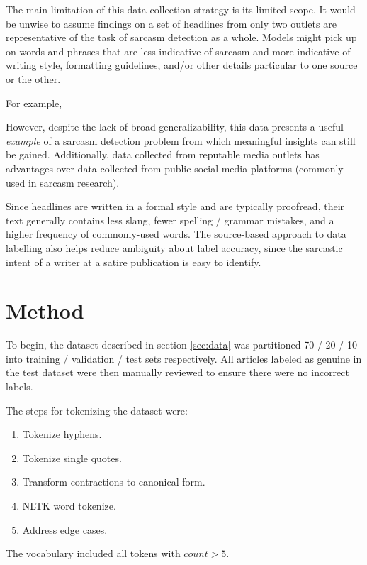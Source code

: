 \documentclass[11pt]{article}
\begin{document}
The main limitation of this data collection strategy is its limited scope. It
would be unwise to assume findings on a set of headlines from only two outlets
are representative of the task of sarcasm detection as a whole. Models might
pick up on words and phrases that are less indicative of sarcasm and more
indicative of writing style, formatting guidelines, and/or other details
particular to one source or the other.

For example,


However, despite the lack of broad generalizability, this data presents a
useful \textit{example} of a sarcasm detection problem from which meaningful
insights can still be gained. Additionally, data collected from reputable media
outlets has advantages over data collected from public social media platforms
(commonly used in sarcasm research).

Since headlines are written in a formal style and are typically proofread,
their text generally contains less slang, fewer spelling / grammar mistakes,
and a higher frequency of commonly-used words. The source-based approach to
data labelling also helps reduce ambiguity about label accuracy, since the
sarcastic intent of a writer at a satire publication is easy to identify.




\section{Method}

To begin, the dataset described in section \ref{sec:data} was partitioned 70 /
20 / 10 into training / validation / test sets respectively. All articles
labeled as genuine in the test dataset were then manually reviewed to ensure
there were no incorrect labels.

The steps for tokenizing the dataset were:
\begin{enumerate}
    \item Tokenize hyphens.
    \item Tokenize single quotes.
    \item Transform contractions to canonical form.
    \item NLTK word tokenize.
    \item Address edge cases.
\end{enumerate}
The vocabulary included all tokens with $ count > 5 $.
\end{document}

